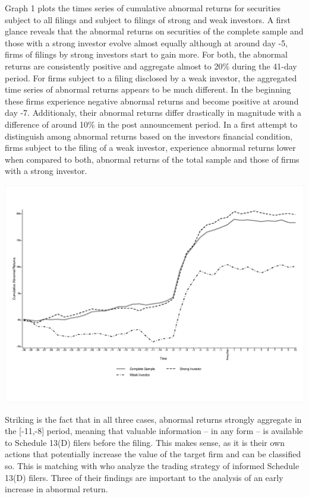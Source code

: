 \documentclass[12pt]{article}
\begin{document}
Graph 1 plots the times series of cumulative abnormal returns for securities subject to all filings and subject to filings of strong and weak investors. A first glance reveals that the abnormal returns on securities of the complete sample and those with a strong investor evolve almost equally although at around day -5, firms of filings by strong investors start to gain more. For both, the abnormal returns are consistently positive and aggregate almost to 20\% during the 41-day period. 
For firms subject to a filing disclosed by a weak investor, the aggregated time series of abnormal returns  appears to be much different. In the beginning these firms experience negative abnormal returns and become positive at around day -7. Additionaly, their abnormal returns differ drastically in magnitude with a difference of around 10\% in the post announcement period. 
In a first attempt to distinguish among abnormal returns based on the investors financial condition, firms subject to the filing of a weak investor, experience abnormal returns lower when compared to both, abnormal returns of the total sample and those of firms with a strong investor.\\
\begin{table}
	\centering
	\begin{adjustbox}{max width=\textwidth}
		\includegraphics{Abnormal_Returns.eps} \label{AR}
	\end{adjustbox}
\end{table}
Striking is the fact that in all three cases, abnormal returns strongly aggregate in the [-11,-8] period, meaning that valuable information -- in any form -- is available to Schedule 13(D) filers before the filing. This makes sense, as it is their own actions that potentially increase the value of the target firm and can be classified so. This is matching with \citet[p.1561]{Collin-Dufresne2015} who analyze the trading strategy of informed Schedule 13(D) filers. Three of their findings are important to the analysis of an early increase in abnormal return. 
\end{document}
